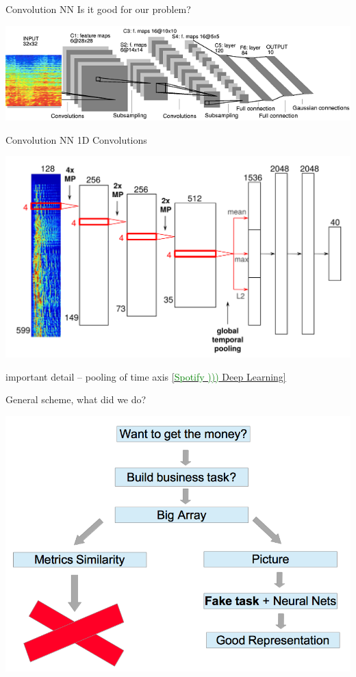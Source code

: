 \documentclass{beamer}
\begin{document}
\begin{frame}{Convolution NN} 
		Is it good for our problem?
		\begin{center}
			\includegraphics[scale=0.8]{img/conv}
		\end{center}
\end{frame}

\begin{frame}{Convolution NN} 
	1D Convolutions 
	\begin{center}				
		\includegraphics[scale=2]{img/rconv}
	\end{center}

important detail -- pooling of time axis \href{http://bit.ly/1slJTgi}{[\textcolor{green}{Spotify )))} Deep Learning]}
\end{frame}

\begin{frame}{General scheme, what did we do?} 	
	\begin{center}				
		\includegraphics[scale=0.3]{img/scheem}
	\end{center}
\end{frame}
\end{document}
